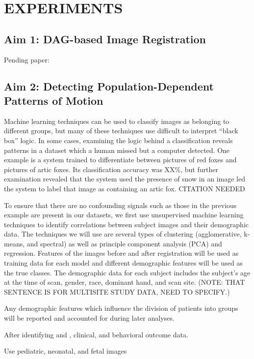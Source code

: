 \chapter{EXPERIMENTS}

\section{Aim 1: DAG-based Image Registration}

Pending paper: 

\section{Aim 2: Detecting Population-Dependent Patterns of Motion}

Machine learning techniques can be used to classify images as belonging to different groups, but many of these techniques use difficult to interpret ``black box'' logic. In some cases, examining the logic behind a classification reveals patterns in a dataset which a human missed but a computer detected. One example is a system trained to differentiate between pictures of red foxes and pictures of artic foxes. Its classification accuracy was XX\%, but further examination revealed that the system used the presence of snow in an image led the system to label that image as containing an artic fox. CITATION NEEDED

To ensure that there are no confounding signals such as those in the previous example are present in our datasets, we first use unsupervised machine learning techniques to identify correlations between subject images and their demographic data. The techniques we will use are several types of clustering (agglomerative, k-means, and spectral) as well as principle component analysis (PCA) and regression. Features of the images before and after registration will be used as training data for each model and different demographic features will be used as the true classes. The demographic data for each subject includes the subject's age at the time of scan, gender, race, dominant hand, and scan site. (NOTE: THAT SENTENCE IS FOR MULTISITE STUDY DATA, NEED TO SPECIFY.)

Any demographic features which influence the division of patients into groups will be reported and accounted for during later analyses.

After identifying and , clinical, and behavioral outcome data. 

Use pediatric, neonatal, and fetal images

